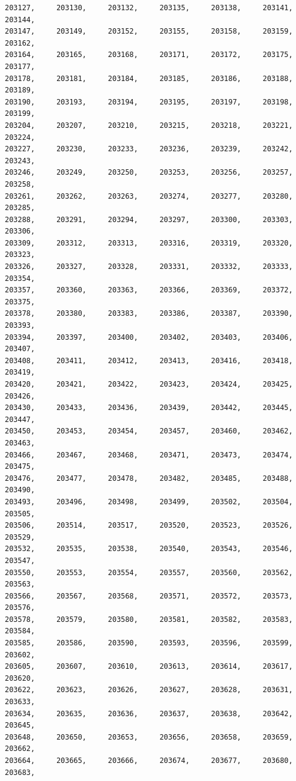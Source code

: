 \documentclass[a4paper,11pt]{report}
\begin{document}
\begin{verbatim}
203127,     203130,     203132,     203135,     203138,     203141,     203144,
203147,     203149,     203152,     203155,     203158,     203159,     203162,
203164,     203165,     203168,     203171,     203172,     203175,     203177,
203178,     203181,     203184,     203185,     203186,     203188,     203189,
203190,     203193,     203194,     203195,     203197,     203198,     203199,
203204,     203207,     203210,     203215,     203218,     203221,     203224,
203227,     203230,     203233,     203236,     203239,     203242,     203243,
203246,     203249,     203250,     203253,     203256,     203257,     203258,
203261,     203262,     203263,     203274,     203277,     203280,     203285,
203288,     203291,     203294,     203297,     203300,     203303,     203306,
203309,     203312,     203313,     203316,     203319,     203320,     203323,
203326,     203327,     203328,     203331,     203332,     203333,     203354,
203357,     203360,     203363,     203366,     203369,     203372,     203375,
203378,     203380,     203383,     203386,     203387,     203390,     203393,
203394,     203397,     203400,     203402,     203403,     203406,     203407,
203408,     203411,     203412,     203413,     203416,     203418,     203419,
203420,     203421,     203422,     203423,     203424,     203425,     203426,
203430,     203433,     203436,     203439,     203442,     203445,     203447,
203450,     203453,     203454,     203457,     203460,     203462,     203463,
203466,     203467,     203468,     203471,     203473,     203474,     203475,
203476,     203477,     203478,     203482,     203485,     203488,     203490,
203493,     203496,     203498,     203499,     203502,     203504,     203505,
203506,     203514,     203517,     203520,     203523,     203526,     203529,
203532,     203535,     203538,     203540,     203543,     203546,     203547,
203550,     203553,     203554,     203557,     203560,     203562,     203563,
203566,     203567,     203568,     203571,     203572,     203573,     203576,
203578,     203579,     203580,     203581,     203582,     203583,     203584,
203585,     203586,     203590,     203593,     203596,     203599,     203602,
203605,     203607,     203610,     203613,     203614,     203617,     203620,
203622,     203623,     203626,     203627,     203628,     203631,     203633,
203634,     203635,     203636,     203637,     203638,     203642,     203645,
203648,     203650,     203653,     203656,     203658,     203659,     203662,
203664,     203665,     203666,     203674,     203677,     203680,     203683,

\end{verbatim}
\end{document}
